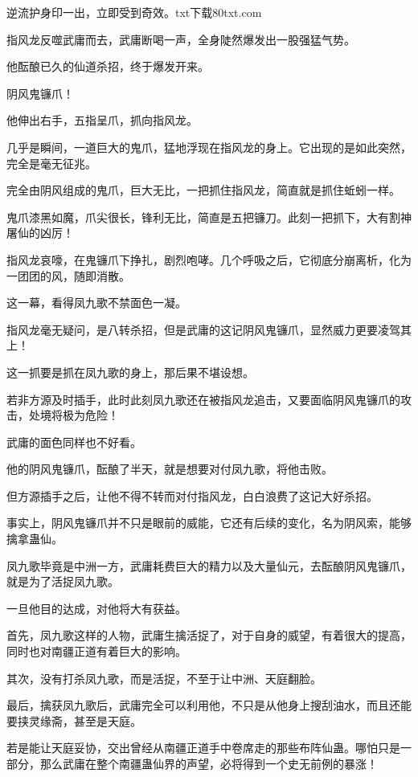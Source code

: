 
\begin{this_body}

逆流护身印一出，立即受到奇效。txt下载80txt.com

指风龙反噬武庸而去，武庸断喝一声，全身陡然爆发出一股强猛气势。

他酝酿已久的仙道杀招，终于爆发开来。

阴风鬼镰爪！

他伸出右手，五指呈爪，抓向指风龙。

几乎是瞬间，一道巨大的鬼爪，猛地浮现在指风龙的身上。它出现的是如此突然，完全是毫无征兆。

完全由阴风组成的鬼爪，巨大无比，一把抓住指风龙，简直就是抓住蚯蚓一样。

鬼爪漆黑如魔，爪尖很长，锋利无比，简直是五把镰刀。此刻一把抓下，大有割神屠仙的凶厉！

指风龙哀嚎，在鬼镰爪下挣扎，剧烈咆哮。几个呼吸之后，它彻底分崩离析，化为一团团的风，随即消散。

这一幕，看得凤九歌不禁面色一凝。

指风龙毫无疑问，是八转杀招，但是武庸的这记阴风鬼镰爪，显然威力更要凌驾其上！

这一抓要是抓在凤九歌的身上，那后果不堪设想。

若非方源及时插手，此时此刻凤九歌还在被指风龙追击，又要面临阴风鬼镰爪的攻击，处境将极为危险！

武庸的面色同样也不好看。

他的阴风鬼镰爪，酝酿了半天，就是想要对付凤九歌，将他击败。

但方源插手之后，让他不得不转而对付指风龙，白白浪费了这记大好杀招。

事实上，阴风鬼镰爪并不只是眼前的威能，它还有后续的变化，名为阴风索，能够擒拿蛊仙。

凤九歌毕竟是中洲一方，武庸耗费巨大的精力以及大量仙元，去酝酿阴风鬼镰爪，就是为了活捉凤九歌。

一旦他目的达成，对他将大有获益。

首先，凤九歌这样的人物，武庸生擒活捉了，对于自身的威望，有着很大的提高，同时也对南疆正道有着巨大的影响。

其次，没有打杀凤九歌，而是活捉，不至于让中洲、天庭翻脸。

最后，擒获凤九歌后，武庸完全可以利用他，不只是从他身上搜刮油水，而且还能要挟灵缘斋，甚至是天庭。

若是能让天庭妥协，交出曾经从南疆正道手中卷席走的那些布阵仙蛊。哪怕只是一部分，那么武庸在整个南疆蛊仙界的声望，必将得到一个史无前例的暴涨！


\end{this_body}
